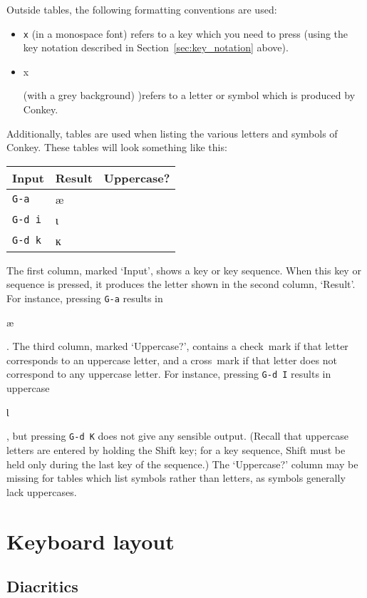 \documentclass[oneside]{memoir}
\newcommand{\cmark}{\ding{51}}
\newcommand{\xmark}{\ding{55}}
\newcommand{\key}{\verb}
\newcommand{\out}[1]{\colorbox{gray!20}{\strut{}#1}}
\begin{document}
{{Outside tables, the following formatting conventions are used:

\begin{itemize}[noitemsep]
\item \key|x| (in a monospace font) refers to a key which you need to press (using the key notation described in Section~\ref{sec:key_notation} above).
\item \out{x} (with a grey background) )refers to a letter or symbol which is produced by Conkey.
\end{itemize}

Additionally, tables are used when listing the various letters and symbols of Conkey.
These tables will look something like this:

\medskip

\begin{tabular}{lll}
\toprule
Input & Result & Uppercase? \\
\midrule
\key|G-a|   & æ & \cmark \\
\key|G-d i| & ɩ & \cmark \\
\key|G-d k| & ĸ & \xmark \\
\bottomrule
\end{tabular}

\medskip

The first column, marked `Input', shows a key or key sequence.
When this key or sequence is pressed, it produces the letter shown in the second column, `Result'.
For instance, pressing \key|G-a| results in \out{æ}.
The third column, marked `Uppercase?', contains a check~mark if that letter corresponds to an uppercase letter,
  and a cross~mark if that letter does not correspond to any uppercase letter.
For instance, pressing \key|G-d I| results in uppercase \out{Ɩ},
  but pressing \key|G-d K| does not give any sensible output.
(Recall that uppercase letters are entered by holding the Shift key;
  for a key sequence, Shift must be held only during the last key of the sequence.)
The `Uppercase?' column may be missing for tables which list symbols rather than letters, as symbols generally lack uppercases.

\chapter{Keyboard layout}
\label{sec:keyboard_layout}

\section{Diacritics}
\label{sec:diacritics}

}}
\end{document}

